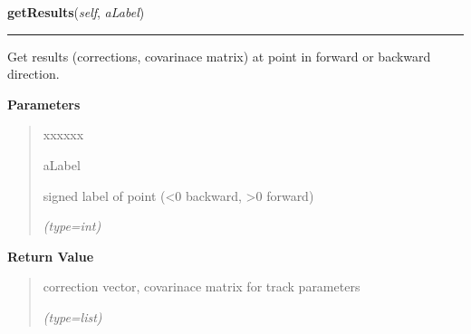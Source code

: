 \hspace{.8\funcindent}\begin{boxedminipage}{\funcwidth}

    \raggedright \textbf{getResults}(\textit{self}, \textit{aLabel})

    \vspace{-1.5ex}

    \rule{\textwidth}{0.5\fboxrule}
\setlength{\parskip}{2ex}
    Get results (corrections, covarinace matrix) at point in forward or 
    backward direction.

\setlength{\parskip}{1ex}
      \textbf{Parameters}
      \vspace{-1ex}

      \begin{quote}
        \begin{Ventry}{xxxxxx}

          \item[aLabel]

          signed label of point ({\textless}0 backward, {\textgreater}0 
          forward)

            {\it (type=int)}

        \end{Ventry}

      \end{quote}

      \textbf{Return Value}
    \vspace{-1ex}

      \begin{quote}
      correction vector, covarinace matrix for track parameters

      {\it (type=list)}

      \end{quote}

    \end{boxedminipage}

    \label{gblfit:GblTrajectory:fit}

    \vspace{0.5ex}

